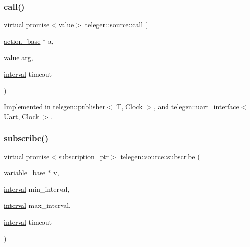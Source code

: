 \subsubsection{\texorpdfstring{call()}{call()}}
{\footnotesize\ttfamily virtual \hyperlink{namespacetelegen_a9dd802bb5d30cf96b0c616750d43ae86}{promise}$<$\hyperlink{classtelegen_1_1value}{value}$>$ telegen\+::source\+::call (\begin{DoxyParamCaption}\item[{\hyperlink{classtelegen_1_1action__base}{action\+\_\+base} $\ast$}]{a,  }\item[{\hyperlink{classtelegen_1_1value}{value}}]{arg,  }\item[{\hyperlink{namespacetelegen_ad925de2d0a99bc43918533abf0457344}{interval}}]{timeout }\end{DoxyParamCaption})\hspace{0.3cm}{\ttfamily [pure virtual]}}



Implemented in \hyperlink{classtelegen_1_1publisher_a3b5f514d064a6bca0209753dd724a2a7}{telegen\+::publisher$<$ T, Clock $>$}, and \hyperlink{classtelegen_1_1uart__interface_acaf4ff8f9442b3d4d2b9d5bcc252d08e}{telegen\+::uart\+\_\+interface$<$ Uart, Clock $>$}.

\mbox{\label{classtelegen_1_1source_a224b4eb02ea346aca099615a5ae00ea9}} 
\subsubsection{\texorpdfstring{subscribe()}{subscribe()}}
{\footnotesize\ttfamily virtual \hyperlink{namespacetelegen_a9dd802bb5d30cf96b0c616750d43ae86}{promise}$<$\hyperlink{namespacetelegen_a27c822534a5231fe1c523c81e8768afb}{subscription\+\_\+ptr}$>$ telegen\+::source\+::subscribe (\begin{DoxyParamCaption}\item[{\hyperlink{classtelegen_1_1variable__base}{variable\+\_\+base} $\ast$}]{v,  }\item[{\hyperlink{namespacetelegen_ad925de2d0a99bc43918533abf0457344}{interval}}]{min\+\_\+interval,  }\item[{\hyperlink{namespacetelegen_ad925de2d0a99bc43918533abf0457344}{interval}}]{max\+\_\+interval,  }\item[{\hyperlink{namespacetelegen_ad925de2d0a99bc43918533abf0457344}{interval}}]{timeout }\end{DoxyParamCaption})\hspace{0.3cm}{\ttfamily [pure virtual]}}



